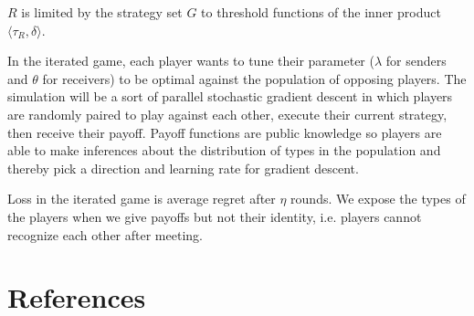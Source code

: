 \documentclass{article}
\begin{document}
\noindent $R$ is limited by the strategy set $G$ to threshold functions of the inner product $\langle \tau_R, \delta \rangle$.

In the iterated game, each player wants to tune their parameter ($\lambda$ for senders and $\theta$ for receivers) to be optimal against the population of opposing players. The simulation will be a sort of parallel stochastic gradient descent in which players are randomly paired to play against each other, execute their current strategy, then receive their payoff. Payoff functions are public knowledge so players are able to make inferences about the distribution of types in the population and thereby pick a direction and learning rate for gradient descent.

Loss in the iterated game is average regret after $\eta$ rounds. We expose the types of the players when we give payoffs but not their identity, i.e. players cannot recognize each other after meeting.


\section{References}



\end{document}
